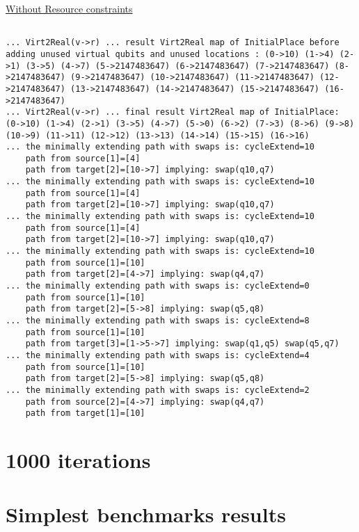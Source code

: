 \documentclass[11pt]{article}
\begin{document}
\begin{minipage}[t]{.45\textwidth}

\uline{Without Resource constraints}

\begin{verbatim}

... Virt2Real(v->r) ... result Virt2Real map of InitialPlace before adding unused virtual qubits and unused locations : (0->10) (1->4) (2->1) (3->5) (4->7) (5->2147483647) (6->2147483647) (7->2147483647) (8->2147483647) (9->2147483647) (10->2147483647) (11->2147483647) (12->2147483647) (13->2147483647) (14->2147483647) (15->2147483647) (16->2147483647)
... Virt2Real(v->r) ... final result Virt2Real map of InitialPlace: (0->10) (1->4) (2->1) (3->5) (4->7) (5->0) (6->2) (7->3) (8->6) (9->8) (10->9) (11->11) (12->12) (13->13) (14->14) (15->15) (16->16)
... the minimally extending path with swaps is: cycleExtend=10
	path from source[1]=[4]
	path from target[2]=[10->7] implying: swap(q10,q7)
... the minimally extending path with swaps is: cycleExtend=10
	path from source[1]=[4]
	path from target[2]=[10->7] implying: swap(q10,q7)
... the minimally extending path with swaps is: cycleExtend=10
	path from source[1]=[4]
	path from target[2]=[10->7] implying: swap(q10,q7)
... the minimally extending path with swaps is: cycleExtend=10
	path from source[1]=[10]
	path from target[2]=[4->7] implying: swap(q4,q7)
... the minimally extending path with swaps is: cycleExtend=0
	path from source[1]=[10]
	path from target[2]=[5->8] implying: swap(q5,q8)
... the minimally extending path with swaps is: cycleExtend=8
	path from source[1]=[10]
	path from target[3]=[1->5->7] implying: swap(q1,q5) swap(q5,q7)
... the minimally extending path with swaps is: cycleExtend=4
	path from source[1]=[10]
	path from target[2]=[5->8] implying: swap(q5,q8)
... the minimally extending path with swaps is: cycleExtend=2
	path from source[2]=[4->7] implying: swap(q4,q7)
	path from target[1]=[10]
\end{verbatim}


\end{minipage}

\section{1000 iterations}
\label{sec:orgd10900a}
\section{Simplest benchmarks results}
\label{sec:org33a65c5}
\end{document}
